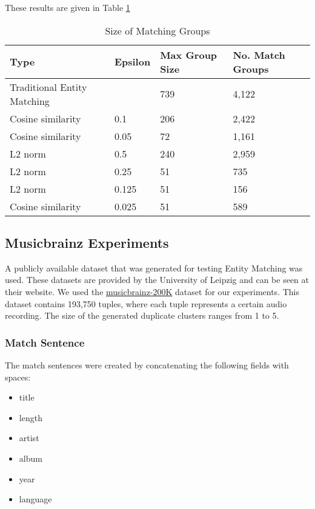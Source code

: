 \documentclass{article}
\begin{document}
These results are given in Table \ref{tab:results}
\begin{table}[h]
 \caption{Size of Matching Groups}
  \begin{tabular}{llll}
    \toprule
    Type                        & Epsilon & Max Group Size & No. Match Groups \\
    \midrule
    Traditional Entity Matching &         & 739            & 4,122  \\
    Cosine similarity           & 0.1     & 206            & 2,422  \\
    Cosine similarity           & 0.05    & 72             & 1,161  \\
    L2 norm                     & 0.5     & 240            & 2,959  \\
    L2 norm                     & 0.25    & 51             & 735    \\
    L2 norm                     & 0.125   & 51             & 156    \\
    Cosine similarity           & 0.025   & 51             & 589    \\
    \bottomrule
  \end{tabular}
  \label{tab:results}
\end{table}

\subsection{Musicbrainz Experiments}
A publicly available dataset that was generated for testing Entity Matching was used. These datasets are provided by the University of Leipzig and can be seen at their website\cite{emDatasets}. We used the  \href{https://dbs.uni-leipzig.de/files/datasets/saeedi/musicbrainz-200-A01.csv.dapo}{musicbrainz-200K} dataset for our experiments. This dataset contains 193,750 tuples, where each tuple represents a certain audio recording. The size of the generated duplicate clusters ranges from 1 to 5.

\subsubsection{Match Sentence}
The match sentences were created by concatenating the following fields with spaces:

\begin{itemize}
\item title
\item length
\item artist
\item album
\item year
\item language
\end{itemize}
\end{document}
